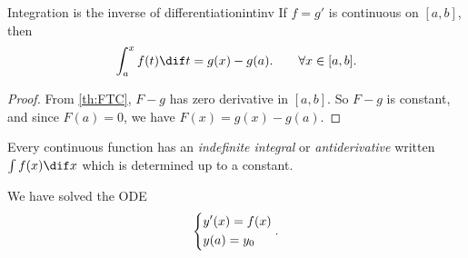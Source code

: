 \begin{corollary}{Integration is the inverse of differentiation}{intinv}
    If \(f = g'\) is continuous on \([a,b]\), then
    \[
        \int_a^x f(t) \dif t = g(x) - g(a). \qquad \forall x\in [a,b].
    \]
\end{corollary}
\begin{proof}
    From \cref{th:FTC}, \(F - g\) has zero derivative in \([a,b]\). So \(F - g\) is constant, and since \(F(a) = 0\), we have \(F(x) = g(x) - g(a)\).
\end{proof}
Every continuous function has an \textit{indefinite integral} or \textit{antiderivative} written \(\int f(x) \dif x\) which is determined up to a constant.
\begin{remark}
    We have solved the ODE
    \[
    \begin{dcases}
        y'(x) = f(x)\\
        y(a) = y_0
    \end{dcases}.
    \]
\end{remark}
